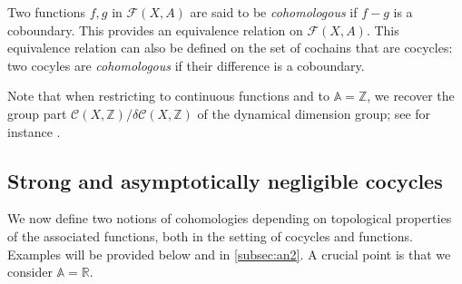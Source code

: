 \documentclass{article}
\theoremstyle{definition}
\newcommand{\R}{\mathbb{R}}
\newcommand{\bA}{\mathbb{A}}
\begin{document}
 
 Two functions $f,g$
in  ${\mathcal F}(X,A)$ are said to be {\it cohomologous} if $f-g$ is a coboundary.  
This  provides  an equivalence relation  on  ${\mathcal F}(X,A)$.   This  equivalence relation can also
 be defined on the  set of   cochains that are cocycles:
two  cocyles  are  \emph{cohomologous}  if their difference is a coboundary. 

Note that when  restricting to continuous functions and to  $\bA={\mathbb Z}$, we recover the  group part   $ {\mathcal C}(X,{\mathbb Z})/\delta  {\mathcal  C}(X,{\mathbb Z})$ of the  dynamical   dimension group;  see for instance
\cite{GPS:95}. 



\subsection{Strong  and  asymptotically negligible cocycles} \label{subsec:an}
We now define two notions of cohomologies  depending on topological properties of the associated  functions,  both in the setting of cocycles   and functions.  Examples  will be provided  below and in  \cref{subsec:an2}. A crucial point is that   we consider $\bA=\R$.
\end{document}

